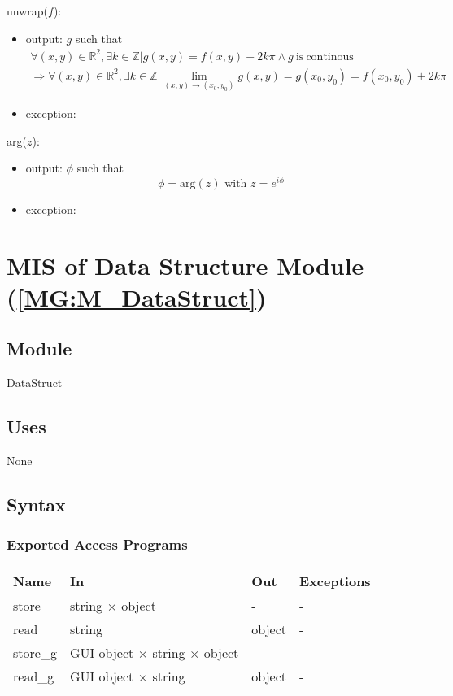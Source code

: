 \documentclass[12pt, titlepage]{article}
\begin{document}
\noindent unwrap($f$):
\begin{itemize} 
\item output: $g$ such that
\begin{equation*}
\begin{gathered}
\forall (x,y) \in \mathbb{R}^2, \exists k \in \mathbb{Z} | g(x,y) =f(x,y) + 2k\pi \wedge g \ \text{is} \  \text{continous}\\
\Rightarrow \forall (x,y) \in \mathbb{R}^2, \exists k \in \mathbb{Z} | \lim_{(x,y)\to (x_0,y_0)} g(x,y) = g(x_0,y_0) = f(x_0,y_0) + 2k\pi
\end{gathered}
\end{equation*}
\item exception:
\end{itemize}

\noindent arg($z$):
\begin{itemize} 
\item output: $\phi$ such that
\begin{equation*}
\phi=\text{arg}(z) \text{ with } z=e^{i\phi}
\end{equation*}
\item exception:
\end{itemize}


\section{MIS of Data Structure Module (\texorpdfstring{\cref{MG:M_DataStruct}}))} \label{MIS_DataStruct}

\subsection{Module}
DataStruct
\subsection{Uses}
None
\subsection{Syntax}

\subsubsection{Exported Access Programs}

\begin{center}
\begin{tabular}{p{4cm} p{4cm} p{4cm} p{2cm}}
\hline
\textbf{Name} & \textbf{In} & \textbf{Out} & \textbf{Exceptions} \\
\hline
store & string $\times$ object & - & - \\
read & string & object & - \\
store{\_}g & GUI object $\times$ string $\times$ object & - & - \\
read{\_}g & GUI object $\times$ string & object & - \\
\hline
\end{tabular}
\end{center}
\end{document}
